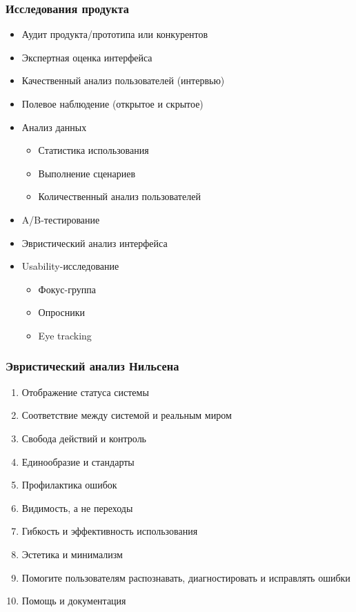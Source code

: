 \documentclass{../../slides-style}
\begin{document}
    \begin{frame}
        \frametitle{Исследования продукта}
        \begin{itemize}
            \item Аудит продукта/прототипа или конкурентов
            \item Экспертная оценка интерфейса
            \item Качественный анализ пользователей (интервью)
            \item Полевое наблюдение (открытое и скрытое)
            \item Анализ данных
            \begin{itemize}
                \item Статистика использования
                \item Выполнение сценариев
                \item Количественный анализ пользователей
            \end{itemize}
            \item A/B-тестирование
            \item Эвристический анализ интерфейса
            \item Usability-исследование
            \begin{itemize}
                \item Фокус-группа
                \item Опросники
                \item Eye tracking
            \end{itemize}
        \end{itemize}
    \end{frame}

    \begin{frame}
        \frametitle{Эвристический анализ Нильсена}
        \begin{enumerate}
            \item Отображение статуса системы
            \item Соответствие между системой и реальным миром
            \item Свобода действий и контроль
            \item Единообразие и стандарты
            \item Профилактика ошибок
            \item Видимость, а не переходы
            \item Гибкость и эффективность использования
            \item Эстетика и минимализм
            \item Помогите пользователям распознавать, диагностировать и исправлять ошибки
            \item Помощь и документация
        \end{enumerate}
    \end{frame}
\end{document}
